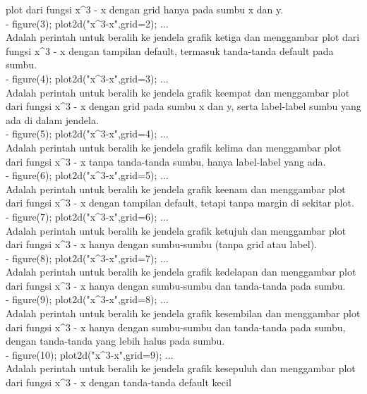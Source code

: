 \documentclass[a4paper,10pt]{article}
\begin{document}
\begin{eulernotebook}
\begin{eulercomment}
\begin{eulercomment}
\begin{eulercomment}
plot dari fungsi x\textasciicircum{}3 - x dengan grid hanya pada sumbu x dan y.\\
- figure(3); plot2d("x\textasciicircum{}3-x",grid=2); ...\\
Adalah perintah untuk beralih ke jendela grafik ketiga dan menggambar
plot dari fungsi x\textasciicircum{}3 - x dengan tampilan default, termasuk tanda-tanda
default pada sumbu.\\
- figure(4); plot2d("x\textasciicircum{}3-x",grid=3); ...\\
Adalah perintah untuk beralih ke jendela grafik keempat dan menggambar
plot dari fungsi x\textasciicircum{}3 - x dengan grid pada sumbu x dan y, serta
label-label sumbu yang ada di dalam jendela.\\
- figure(5); plot2d("x\textasciicircum{}3-x",grid=4); ...\\
Adalah perintah untuk beralih ke jendela grafik kelima dan menggambar
plot dari fungsi x\textasciicircum{}3 - x tanpa tanda-tanda sumbu, hanya label-label
yang ada.\\
- figure(6); plot2d("x\textasciicircum{}3-x",grid=5); ...\\
Adalah perintah untuk beralih ke jendela grafik keenam dan menggambar
plot dari fungsi x\textasciicircum{}3 - x dengan tampilan default, tetapi tanpa margin
di sekitar plot.\\
- figure(7); plot2d("x\textasciicircum{}3-x",grid=6); ...\\
Adalah perintah untuk beralih ke jendela grafik ketujuh dan menggambar
plot dari fungsi x\textasciicircum{}3 - x hanya dengan sumbu-sumbu (tanpa grid atau
label).\\
- figure(8); plot2d("x\textasciicircum{}3-x",grid=7); ...\\
Adalah perintah untuk beralih ke jendela grafik kedelapan dan
menggambar plot dari fungsi x\textasciicircum{}3 - x hanya dengan sumbu-sumbu dan
tanda-tanda pada sumbu.\\
- figure(9); plot2d("x\textasciicircum{}3-x",grid=8); ...\\
Adalah perintah untuk beralih ke jendela grafik kesembilan dan
menggambar plot dari fungsi x\textasciicircum{}3 - x hanya dengan sumbu-sumbu dan
tanda-tanda pada sumbu, dengan tanda-tanda yang lebih halus pada
sumbu.\\
- figure(10); plot2d("x\textasciicircum{}3-x",grid=9); ...\\
Adalah perintah untuk beralih ke jendela grafik kesepuluh dan
menggambar plot dari fungsi x\textasciicircum{}3 - x dengan tanda-tanda default kecil

\end{eulercomment}
\end{eulercomment}
\end{eulercomment}
\end{eulernotebook}
\end{document}
